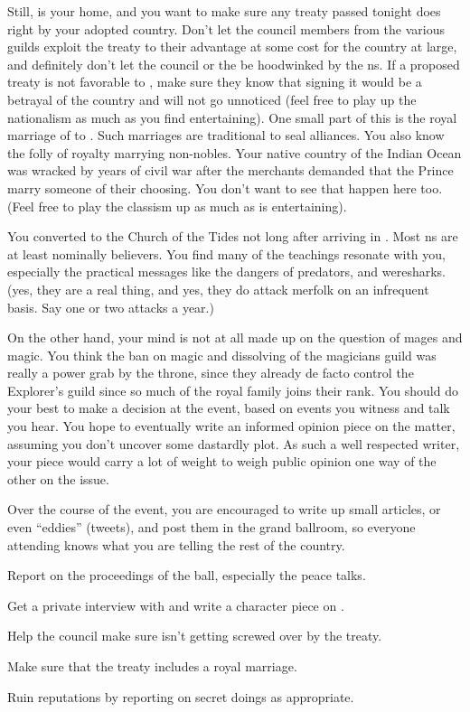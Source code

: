 \documentclass[char]{NeptuneBall}
\begin{document}
Still, \pAtlantis{} is your home, and you want to make sure any treaty passed tonight does right by your adopted country. Don't let the council members from the various guilds exploit the treaty to their advantage at some cost for the country at large, and definitely don't let the council or the \cKing{\King} be hoodwinked by the \pPacifica{}ns. If a proposed treaty is not favorable to \pAtlantis{}, make sure they know that signing it would be a betrayal of the country and will not go unnoticed (feel free to play up the nationalism as much as you find entertaining). One small part of this is the royal marriage of \cPrincess{} to \cPrince{}. Such marriages are traditional to seal alliances. You also know the folly of royalty marrying non-nobles. Your native country of the Indian Ocean was wracked by years of civil war after the merchants demanded that the Prince marry someone of their choosing. You don't want to see that happen here too. (Feel free to play the classism up as much as is entertaining). 

You converted to the Church of the Tides not long after arriving in \pAtlantis{}. Most \pAtlantis{}ns are at least nominally believers. You find many of the teachings resonate with you, especially the practical messages like the dangers of predators, and weresharks. (yes, they are a real thing, and yes, they do attack merfolk on an infrequent basis. Say one or two attacks a year.)

On the other hand, your mind is not at all made up on the question of mages and magic. You think the ban on magic and dissolving of the magicians guild was really a power grab by the throne, since they already de facto control the Explorer’s guild since so much of the royal family joins their rank. You should do your best to make a decision at the event, based on events you witness and talk you hear. You hope to eventually write an informed opinion piece on the matter, assuming you don't uncover some dastardly plot. As such a well respected writer, your piece would carry a lot of weight to weigh public opinion one way of the other on the issue.

Over the course of the event, you are encouraged to write up small articles, or even “eddies” (tweets), and post them in the grand ballroom, so everyone attending knows what you are telling the rest of the country.

\begin{itemz}[Goals]
  \item Report on the proceedings of the ball, especially the peace talks.
	\item Get a private interview with \cPrince{} and write a character piece on \cPrince{\them}.
	\item Help the council make sure \pAtlantis{} isn't getting screwed over by the treaty.
	\item Make sure that the treaty includes a royal marriage.
	\item Ruin reputations by reporting on secret doings as appropriate.
\end{itemz}
\end{document}
